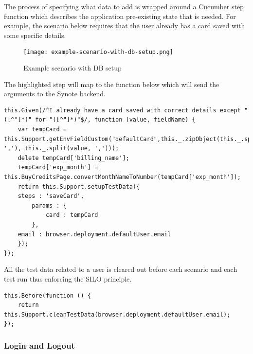The process of specifying what data to add is wrapped around a Cucumber step function which describes the application pre-existing state that is needed. For example, the scenario below requires that the user already has a card saved with some specific details. 

\begin{figure}[!hbt]
  	\centering
 	\texttt{[image: example-scenario-with-db-setup.png]}
  	\caption{Example scenario with DB setup}
 	\label{fig:example-scenario-with-db-setup}
\end{figure}

The highlighted step will map to the function below which will send the arguments to the Synote backend.

\begin{listing}[H]
\begin{verbatim}
this.Given(/^I already have a card saved with correct details except "([^"]*)" for "([^"]*)"$/, function (value, fieldName) {
	var tempCard = this.Support.getEnvFieldCustom("defaultCard",this._.zipObject(this._.split(fieldName, ','), this._.split(value, ',')));
	delete tempCard['billing_name'];
	tempCard['exp_month'] = this.BuyCreditsPage.convertMonthNameToNumber(tempCard['exp_month']);
	return this.Support.setupTestData({
	steps : 'saveCard',
		params : {
			card : tempCard
		},
	email : browser.deployment.defaultUser.email
	});
});
\end{verbatim}
\label{lst:data-insertion-step-function}
\end{listing}

All the test data related to a user is cleared out before each scenario and each test run thus enforcing the SILO principle.

\begin{listing}[H]
\begin{verbatim}
this.Before(function () {
	return this.Support.cleanTestData(browser.deployment.defaultUser.email);
});
\end{verbatim}
\label{lst:remove-test-data-before-scenario}
\end{listing}

\subsubsection{Login and Logout}
\label{subsubsec:login-and-logout}

